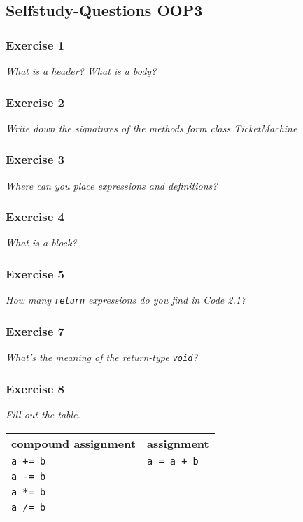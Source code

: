 \subsection{Selfstudy-Questions OOP3}

\subsubsection*{Exercise 1}
\textit{What is a header? What is a body?}\\

\subsubsection*{Exercise 2}
\textit{Write down the signatures of the methods form class 
	TicketMachine}\\

\subsubsection*{Exercise 3}
\textit{Where can you place expressions and definitions?}\\

\subsubsection*{Exercise 4}
\textit{What is a block?}\\

\subsubsection*{Exercise 5}
\textit{How many \lstinline{return} expressions do you find in Code 2.1?}\\

\subsubsection*{Exercise 7}
\textit{What's the meaning of the return-type \lstinline{void}?}\\

\subsubsection*{Exercise 8}
\textit{Fill out the table.}\\

\begin{table}
	\centering
	\begin{tabular}{ll}
		\textbf{compound assignment} & \textbf{assignment} \\
		\lstinline!a += b! & \lstinline!a = a + b! \\
		\lstinline!a -= b! & \\
		\lstinline!a *= b! & \\
		\lstinline!a /= b! & \\
	\end{tabular}
\end{table}

